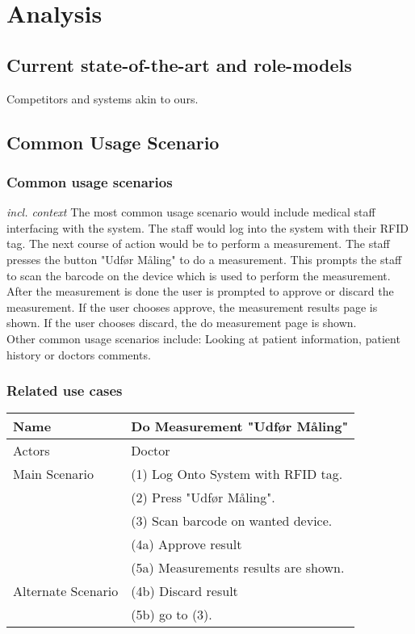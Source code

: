 \chapter{Analysis}
\section{Current state-of-the-art and role-models}
Competitors and systems akin to ours.

\section{Common Usage Scenario}
\subsection{Common usage scenarios}
\textit{incl. context}
The most common usage scenario would include medical staff interfacing with the system. The staff would log into the system with their RFID tag. The next course of action would be to perform a measurement. The staff presses the button "Udfør Måling" to do a measurement. This prompts the staff to scan the barcode on the  device which is used to perform the measurement. After the measurement is done the user is prompted to approve or discard the measurement. If the user chooses approve, the measurement results page is shown. If the user chooses discard, the do measurement page is shown.\\
Other common usage scenarios include: Looking at patient information, patient history or doctors comments.

\subsection{Related use cases}

\begin{table}[H]
    \begin{tabular}{|p{4cm}|p{8cm}|}
    \hline
    Name          & Do Measurement "Udfør Måling"   \\\hline
    Actors        & Doctor \\\hline
    Main Scenario & (1) Log Onto System with RFID tag. \\
    ~             & (2) Press "Udfør Måling". \\
    ~             & (3) Scan barcode on wanted device. \\
    ~             & (4a) Approve result \\         
    ~             & (5a) Measurements results are shown.\\\hline
    
    Alternate Scenario & (4b) Discard result \\
        ~             & (5b) go to (3).\\\hline
    \end{tabular}
\end{table}



